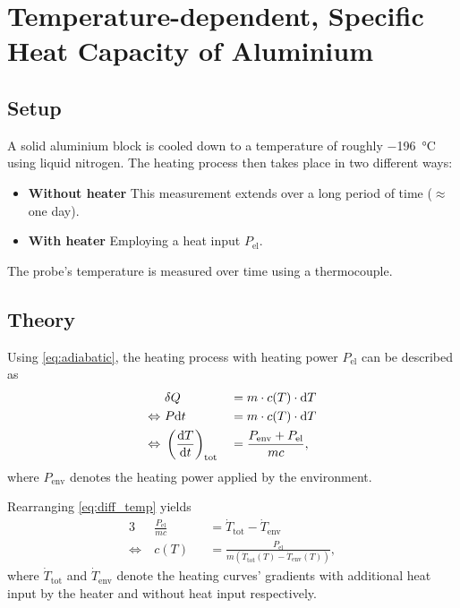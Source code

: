 \chapter{Temperature-dependent, Specific Heat Capacity of Aluminium}
\section{Setup}
A solid aluminium block is cooled down to a temperature of roughly \SI{-196}{\celsius} using liquid nitrogen.
The heating process then takes place in two different ways:
\begin{itemize}
	\item \textbf{Without heater} This measurement extends over a long period of time ($\approx$ one day).
	\item \textbf{With heater} Employing a heat input $P_\text{el}$.
\end{itemize}
The probe's temperature is measured over time using a thermocouple.

\section{Theory}
Using \autoref{eq:adiabatic}, the heating process with heating power $P_\text{el}$ can be described as
\begin{alignat}{3}
										&\delta Q 																	&&= m\cdot c(T)\cdot\text{d} T \nonumber \\
	\Leftrightarrow\ 	&P\text{d} t																			&&= m\cdot c(T)\cdot\text{d} T \nonumber \\
	\Leftrightarrow\ 	&\left(\frac{\text{d} T}{\text{d} t}\right)_\text{tot}	&&= \frac{P_\text{env}+P_\text{el}}{mc}, \label{eq:diff_temp}
\end{alignat}
where $P_\text{env}$ denotes the heating power applied by the environment.

Rearranging \autoref{eq:diff_temp} yields
\begin{alignat}{3}
										& \frac{P_\text{el}}{mc}	&&=\dot{T}_\text{tot}-\dot{T}_\text{env} \nonumber \\
	\Leftrightarrow\	& c(T)										&&=\frac{P_\text{el}}{m\left(\dot{T}_\text{tot}(T)-\dot{T}_\text{env}(T)\right)}, \label{eq:cap_temp}
\end{alignat}
where $\dot{T}_\text{tot}$ and $\dot{T}_\text{env}$ denote the heating curves' gradients with additional heat input by the heater and without heat input respectively.

